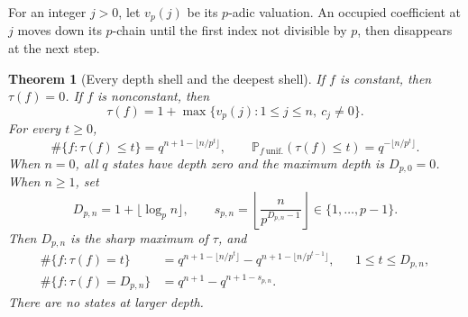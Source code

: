 \documentclass[10pt,a4paper]{amsart}
\newtheorem{theorem}{Theorem}[section]
\theoremstyle{definition}
\theoremstyle{remark}
\newcommand{\Prob}{\mathbb P}
\begin{document}
For an integer $j>0$, let $v_p(j)$ be its $p$-adic valuation.  An occupied
coefficient at $j$ moves down its $p$-chain until the first index not
divisible by $p$, then disappears at the next step.

\begin{theorem}[Every depth shell and the deepest shell]
\label{thm:depth}
If $f$ is constant, then $\tau(f)=0$.  If $f$ is nonconstant, then
\begin{equation}
 \boxed{\quad
 \tau(f)=1+\max\{v_p(j):1\le j\le n,\ c_j\ne0\}.
 \quad}
 \label{eq:point-depth}
\end{equation}
For every $t\ge0$,
\begin{equation}
 \#\{f:\tau(f)\le t\}=q^{n+1-\lfloor n/p^t\rfloor},
 \qquad
 \Prob_{f\ \mathrm{unif.}}(\tau(f)\le t)
 =q^{-\lfloor n/p^t\rfloor}.
 \label{eq:depth-cdf}
\end{equation}
When $n=0$, all $q$ states have depth zero and the maximum depth is
$D_{p,0}=0$.  When $n\ge1$, set
\begin{equation}
 D_{p,n}=1+\lfloor\log_p n\rfloor,
 \qquad
 s_{p,n}=\left\lfloor\frac{n}{p^{D_{p,n}-1}}\right\rfloor
 \in\{1,\ldots,p-1\}.
 \label{eq:D-s}
\end{equation}
Then $D_{p,n}$ is the sharp maximum of $\tau$, and
\begin{align}
 \#\{f:\tau(f)=t\}
 &=q^{n+1-\lfloor n/p^t\rfloor}
   -q^{n+1-\lfloor n/p^{t-1}\rfloor},
 &&1\le t\le D_{p,n},
 \label{eq:depth-shells}\\
 \#\{f:\tau(f)=D_{p,n}\}
 &=q^{n+1}-q^{n+1-s_{p,n}}.
 \label{eq:deepest-shell}
\end{align}
There are no states at larger depth.
\end{theorem}
\end{document}

